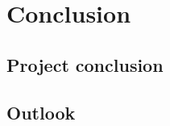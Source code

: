 \chapter{Conclusion}
\label{ch:Conclusion}

\section{Project conclusion}
\label{sec:Project-Conclusion}

\section{Outlook}
\label{sec:Outlook}

